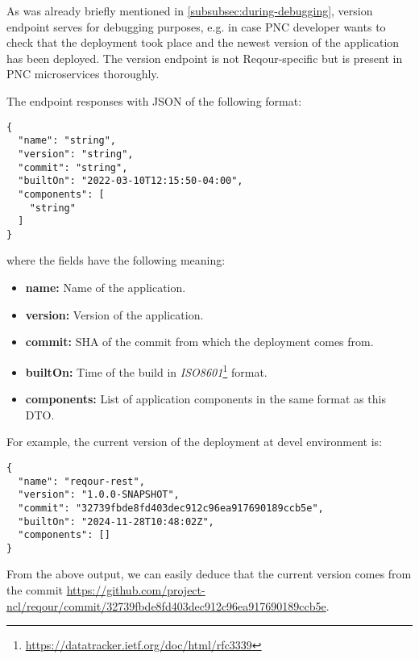 \documentclass[../main.tex]{subfiles}
\begin{document}
As was already briefly mentioned in \ref{subsubsec:during-debugging}, version endpoint serves for debugging purposes, e.g. in case PNC developer wants to check that the deployment took place and the newest version of the application has been deployed. The version endpoint is not Reqour-specific but is present in PNC microservices thoroughly.

The endpoint responses with JSON of the following format:

\begin{lstlisting}[numbers=none]
{
  "name": "string",
  "version": "string",
  "commit": "string",
  "builtOn": "2022-03-10T12:15:50-04:00",
  "components": [
    "string"
  ]
}
\end{lstlisting}

where the fields have the following meaning:
\begin{itemize}
    \item \textbf{name:} Name of the application.
    
    \item \textbf{version:} Version of the application.

    \item \textbf{commit:} SHA of the commit from which the deployment comes from.

    \item \textbf{builtOn:} Time of the build in \textit{ISO8601}\footnote{\url{https://datatracker.ietf.org/doc/html/rfc3339}} format.

    \item \textbf{components:} List of application components in the same format as this DTO.
\end{itemize}

For example, the current version of the deployment at devel environment is:
\begin{lstlisting}[numbers=none]
{
  "name": "reqour-rest",
  "version": "1.0.0-SNAPSHOT",
  "commit": "32739fbde8fd403dec912c96ea917690189ccb5e",
  "builtOn": "2024-11-28T10:48:02Z",
  "components": []
}
\end{lstlisting}

From the above output, we can easily deduce that the current version comes from the commit \url{https://github.com/project-ncl/reqour/commit/32739fbde8fd403dec912c96ea917690189ccb5e}.
\end{document}
